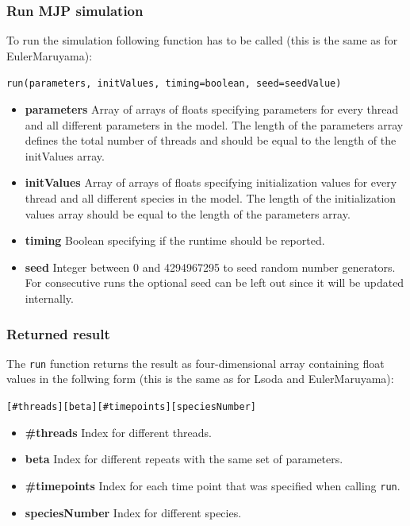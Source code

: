 \documentclass [11pt, a4paper, openany, twoside=off] {article}
\begin{document}
\subsubsection{Run MJP simulation}
To run the simulation following function has to be called (this is the same as for EulerMaruyama):
\begin{center}
\texttt{run(parameters, initValues, timing=boolean, seed=seedValue)}
\end{center}
\begin{itemize}
	\item \textbf{parameters} Array of arrays of floats specifying parameters for every thread and all different parameters in the model. The length of the parameters array defines the total number of threads and should be equal to the length of the initValues array.
	\item \textbf{initValues}  Array of arrays of floats specifying initialization values for every thread and all different species in the model. The length of the initialization values array should be equal to the length of the parameters array.
	\item \textbf{timing} Boolean specifying if the runtime should be reported.
	\item \textbf{seed} Integer between 0 and 4294967295 to seed random number generators. For consecutive runs the optional seed can be left out since it will be updated internally.
\end{itemize}

\subsubsection{Returned result}
The \verb$run$ function returns the result as four-dimensional array containing float values in the follwing form (this is the same as for Lsoda and EulerMaruyama):
\begin{center}
\texttt{[\#threads][beta][\#timepoints][speciesNumber]}
\end{center}
\begin{itemize}
	\item \textbf{\#threads} Index for different threads.
	\item \textbf{beta} Index for different repeats with the same set of parameters.
	\item \textbf{\#timepoints} Index for each time point that was specified when calling \verb$run$.
	\item \textbf{speciesNumber} Index for different species.
\end{itemize}
\end{document}
